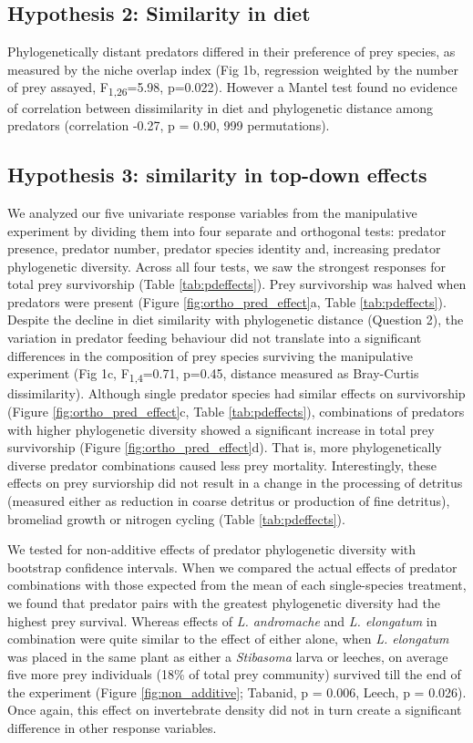 \documentclass[11pt]{article}
\begin{document}
\subsection*{Hypothesis 2: Similarity in diet}

Phylogenetically distant predators differed in their preference of prey
species, as measured by the niche overlap index (Fig 1b, regression
weighted by the number of prey assayed, F\textsubscript{1,26}=5.98,
p=0.022). However a Mantel test found no evidence of correlation between
dissimilarity in diet and phylogenetic distance among predators
(correlation -0.27, p = 0.90, 999 permutations).

\subsection*{Hypothesis 3: similarity in top-down effects}

We analyzed our five univariate response variables from the manipulative
experiment by dividing them into four separate and orthogonal tests:
predator presence, predator number, predator species identity and,
increasing predator phylogenetic diversity. Across all four tests, we
saw the strongest responses for total prey survivorship (Table \ref{tab:pdeffects}). Prey
survivorship was halved when predators were present (Figure \ref{fig:ortho_pred_effect}a, Table \ref{tab:pdeffects}). Despite the decline in diet similarity with phylogenetic distance
(Question 2), the variation in predator feeding behaviour did not
translate into a significant differences in the composition of prey
species surviving the manipulative experiment (Fig 1c,
F\textsubscript{1,4}=0.71, p=0.45, distance measured as Bray-Curtis
dissimilarity). Although single predator species had similar effects on
survivorship (Figure \ref{fig:ortho_pred_effect}c, Table \ref{tab:pdeffects}), combinations of predators with higher
phylogenetic diversity showed a significant increase in total prey
survivorship (Figure \ref{fig:ortho_pred_effect}d). That is, more phylogenetically diverse predator
combinations caused less prey mortality. Interestingly, these effects on
prey surviorship did not result in a change in the processing of
detritus (measured either as reduction in coarse detritus or production
of fine detritus), bromeliad growth or nitrogen cycling (Table \ref{tab:pdeffects}).

We tested for non-additive effects of predator phylogenetic diversity
with bootstrap confidence intervals. When we compared the actual effects
of predator combinations with those expected from the mean of each
single-species treatment, we found that predator pairs with the greatest
phylogenetic diversity had the highest prey survival. Whereas effects of
\emph{L. andromache} and \emph{L. elongatum} in combination were quite
similar to the effect of either alone, when \emph{L. elongatum} was
placed in the same plant as either a \emph{Stibasoma} larva or leeches,
on average five more prey individuals (18\% of total prey community)
survived till the end of the experiment (Figure \ref{fig:non_additive}; Tabanid, p = 0.006,
Leech, p = 0.026). Once again, this effect on invertebrate density did
not in turn create a significant difference in other response variables.
\end{document}
